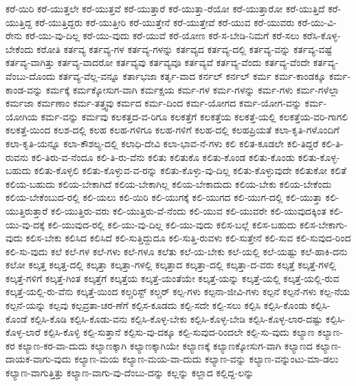 {ಕರೆ-ಯಿರಿ
ಕರೆ-ಯುತ್ತಲೇ
ಕರೆ-ಯುತ್ತವೆ
ಕರೆ-ಯುತ್ತಾರೆ
ಕರೆ-ಯುತ್ತಾ-ರೆಯೋ
ಕರೆ-ಯುತ್ತಾರೋ
ಕರೆ-ಯುತ್ತಿದೆ
ಕರೆ-ಯುತ್ತಿದ್ದ
ಕರೆ-ಯುತ್ತಿದ್ದರು
ಕರೆ-ಯುತ್ತೀರಿ
ಕರೆ-ಯುತ್ತೇನೆ
ಕರೆ-ಯುತ್ತೇವೆ
ಕರೆ-ಯುವ
ಕರೆ-ಯುವರು
ಕರೆ-ಯು-ವಿ-ರೇನು
ಕರೆ-ಯು-ವು-ದಿಲ್ಲ
ಕರೆ-ಯು-ವುದು
ಕರೆ-ಯುವೆ
ಕರೆ-ಯೋಣ
ಕರೆ-ಸ-ಬೇಡಿ-ನಿಮಗೆ
ಕರೆ-ಸಲು
ಕರೆಸಿ-ಕೊಳ್ಳ-ಬೇಕೆಂದು
ಕರೋತಿ
ಕರ್ತವ್ಯ
ಕರ್ತವ್ಯ-ಗಳ
ಕರ್ತವ್ಯ-ಗಳನ್ನು
ಕರ್ತವ್ಯದ
ಕರ್ತವ್ಯ-ದಲ್ಲಿ
ಕರ್ತವ್ಯ-ವನ್ನು
ಕರ್ತವ್ಯ-ವಷ್ಟೆ
ಕರ್ತವ್ಯ-ವಾಗಿತ್ತು
ಕರ್ತವ್ಯ-ವಾದರೋ
ಕರ್ತವ್ಯವು
ಕರ್ತವ್ಯವೂ
ಕರ್ತವ್ಯವೆ
ಕರ್ತವ್ಯ-ವೆಂದು
ಕರ್ತವ್ಯ-ವೆಂದೇ
ಕರ್ತವ್ಯ-ವೆಂಬು-ದೊಂದು
ಕರ್ತವ್ಯ-ವೆಲ್ಲ-ವನ್ನೂ
ಕರ್ತಾಭಜಾ
ಕರ್ತೃ-ವಾದ
ಕರ್ನಲ್
ಕರ್ನಲ್
ಕರ್ಮ
ಕರ್ಮ-ಕಾಂಡಕ್ಕೂ
ಕರ್ಮ-ಕಾಂಡ-ವನ್ನು
ಕರ್ಮಕ್ಕೆ
ಕರ್ಮಕ್ಕೋಸುಗ-ವಾಗಿ
ಕರ್ಮಕ್ಷಯ
ಕರ್ಮ-ಗಳ
ಕರ್ಮ-ಗಳನ್ನು
ಕರ್ಮ-ಗಳು
ಕರ್ಮ-ಗಳೆಲ್ಲಾ
ಕರ್ಮಜಾ
ಕರ್ಮಣಾಂ
ಕರ್ಮ-ತತ್ತ್ವವು
ಕರ್ಮದ
ಕರ್ಮ-ದಿಂದ
ಕರ್ಮ-ಯೋಗದ
ಕರ್ಮ-ಯೋಗ-ವನ್ನು
ಕರ್ಮ-ಯೋಗಿಯ
ಕರ್ಮ-ವನ್ನು
ಕರ್ಮವು
ಕಲಕತ್ತದ-ವ-ರಿಗೂ
ಕಲಕತ್ತೆಗೆ
ಕಲಕತ್ತೆಯ
ಕಲಕತ್ತೆ-ಯಲ್ಲಿ
ಕಲಕತ್ತೆಯ-ವರಿ-ಗಾಗಲಿ
ಕಲಕತ್ತೆ-ಯಿಂದ
ಕಲಶ-ದಲ್ಲಿ
ಕಲಹ
ಕಲಹ-ಗಳಿಗೂ
ಕಲಹ-ಗಳಿಗೆ
ಕಲಹ-ದಲ್ಲಿ
ಕಲಹಪ್ರಿಯತೆ
ಕಲಾ-ಕೃತಿ-ಗಳೊಂದಿಗೆ
ಕಲಾ-ಕೃತಿ-ಯನ್ನೂ
ಕಲಾ-ಕೌಶಲ್ಯ-ದಲ್ಲಿ
ಕಲಾಧಿ-ದೇವಿ
ಕಲಾ-ಭಾವ-ನೆ-ಗಳು
ಕಲಿ
ಕಲಿತ-ಕೂಡಲೇ
ಕಲಿ-ತಿದ್ದರೆ
ಕಲಿ-ತಿ-ರುವನು
ಕಲಿ-ತಿರು-ವ-ನೆಂದೂ
ಕಲಿ-ತಿ-ರು-ವೆನು
ಕಲಿತು
ಕಲಿತುಕೊ
ಕಲಿತು-ಕೊಂಡ
ಕಲಿತು-ಕೊಂಡು
ಕಲಿತು-ಕೊಳ್ಳ-ಬಹುದು
ಕಲಿತು-ಕೊಳ್ಳಲಿ
ಕಲಿತು-ಕೊಳ್ಳುವ-ವ-ರನ್ನು
ಕಲಿತು-ಕೊಳ್ಳು-ವು-ದಿಲ್ಲ
ಕಲಿತು-ಕೊಳ್ಳುವುದೇ
ಕಲಿತುಕೋ
ಕಲಿತೆ
ಕಲಿಯ-ಬಹುದು
ಕಲಿಯ-ಬೇಕಾಗಿದೆ
ಕಲಿಯ-ಬೇಕಾಗಿಲ್ಲ
ಕಲಿಯ-ಬೇಕಾದುದು
ಕಲಿಯ-ಬೇಕು
ಕಲಿಯ-ಬೇಕೆಂದು
ಕಲಿಯ-ಬೇಕೆಂಬುದ-ರಲ್ಲಿ
ಕಲಿ-ಯಲು
ಕಲಿ-ಯಿರಿ
ಕಲಿ-ಯುಗಕ್ಕೆ
ಕಲಿ-ಯುಗದ
ಕಲಿ-ಯುಗ-ದಲ್ಲಿ
ಕಲಿ-ಯುತ್ತಾ
ಕಲಿ-ಯುತ್ತಿರುತ್ತಾರೆ
ಕಲಿ-ಯುತ್ತಿರು-ವರು
ಕಲಿ-ಯುತ್ತಿರು-ವೆ-ನೆಂದು
ಕಲಿ-ಯುವ
ಕಲಿ-ಯುವರೇ
ಕಲಿ-ಯುವುದಕ್ಕಿಂತ
ಕಲಿ-ಯು-ವು-ದಕ್ಕೆ
ಕಲಿ-ಯುವುದ-ರಲ್ಲಿ
ಕಲಿ-ಯು-ವು-ದಿಲ್ಲ
ಕಲಿ-ಯು-ವುದು
ಕಲಿಸ-ಬಲ್ಲೆ
ಕಲಿಸ-ಬಹುದು
ಕಲಿಸ-ಬೇಕಾಗು-ವುದು
ಕಲಿಸ-ಬೇಕು
ಕಲಿಸಿದ
ಕಲಿಸಿದೆ
ಕಲಿ-ಸುತ್ತಿದ್ದುದೂ
ಕಲಿ-ಸುತ್ತಿ-ರುವಳು
ಕಲಿ-ಸುತ್ತೇನೆ
ಕಲಿ-ಸುವ
ಕಲಿ-ಸುವುದ-ರಿಂದ
ಕಲಿ-ಸು-ವುದು
ಕಲೆ
ಕಲೆ-ಗಳ
ಕಲೆ-ಗಳು
ಕಲೆ-ಗಳೂ
ಕಲೆತು
ಕಲೆ-ಯ-ಬೇಕು
ಕಲೆ-ಯಲ್ಲಿ
ಕಲೆ-ಯಷ್ಟು
ಕಲೆ-ಹಾಕಿ-ದನು
ಕಲೋ
ಕಲ್ಕತ್ತ
ಕಲ್ಕತ್ತ-ದಲ್ಲಿ
ಕಲ್ಕತ್ತಾ
ಕಲ್ಕತ್ತಾ-ಗಳಲ್ಲಿ
ಕಲ್ಕತ್ತಾದ
ಕಲ್ಕತ್ತಾ-ದಲ್ಲಿ
ಕಲ್ಕತ್ತಾ-ದ-ವರು
ಕಲ್ಕತ್ತೆ
ಕಲ್ಕತ್ತೆ-ಗಳಲ್ಲಿ
ಕಲ್ಕತ್ತೆ-ಗಳಿಗೆ
ಕಲ್ಕತ್ತೆ-ಗಿಂತ
ಕಲ್ಕತ್ತೆಗೆ
ಕಲ್ಕತ್ತೆಯ
ಕಲ್ಕತ್ತೆ-ಯಂತೆಯೇ
ಕಲ್ಕತ್ತೆ-ಯನ್ನು
ಕಲ್ಕತ್ತೆ-ಯಲ್ಲಿ
ಕಲ್ಕತ್ತೆ-ಯಲ್ಲಿ-ರುವ
ಕಲ್ಕತ್ತೆ-ಯಲ್ಲಿ-ರು-ವೆನು
ಕಲ್ಕತ್ತೆ-ಯಿಂದ
ಕಲ್ಚರಿಸ್ಟ್
ಕಲ್ಚರ್
ಕಲ್ಪ-ಗಳು
ಕಲ್ಪನಾ-ಜೀವಿ-ಗಳು
ಕಲ್ಪನೆ
ಕಲ್ಪನೆ-ಗಳು
ಕಲ್ಪ-ನೆಯ
ಕಲ್ಪನೆ-ಯನ್ನು
ಕಲ್ಪವು
ಕಲ್ಪವ್ರತಾ-ಚರ-ಣೆಗೆ
ಕಲ್ಪಿಸ-ಕೂಡದು
ಕಲ್ಪಿ-ಸದೇ
ಕಲ್ಪಿ-ಸಲು
ಕಲ್ಪಿಸಿ
ಕಲ್ಪಿಸಿ-ಕೊಂಡು
ಕಲ್ಪಿಸಿ-ಕೊಂಡೆ
ಕಲ್ಪಿಸಿ-ಕೊಡಿ
ಕಲ್ಪಿಸಿ-ಕೊಡು-ವನು
ಕಲ್ಪಿಸಿ-ಕೊಳ್ಳ-ಬೇಕು
ಕಲ್ಪಿಸಿ-ಕೊಳ್ಳ-ಬೇಡಿ
ಕಲ್ಪಿಸಿ-ಕೊಳ್ಳ-ಲಾರ-ದಷ್ಟು
ಕಲ್ಪಿಸಿ-ಕೊಳ್ಳ-ಲಾರೆ
ಕಲ್ಪಿಸಿ-ಕೊಳ್ಳಿ
ಕಲ್ಪಿ-ಸುತ್ತಾನೆ
ಕಲ್ಪಿಸು-ವು-ದಕ್ಕೂ
ಕಲ್ಪಿ-ಸುವುದ-ರಿಂದಲೇ
ಕಲ್ಪಿ-ಸು-ವುದು
ಕಲ್ಯಾಣ
ಕಲ್ಯಾಣ-ಕರ
ಕಲ್ಯಾಣ-ಕರ-ವಾ-ದುದು
ಕಲ್ಯಾಣಕ್ಕಾಗಿ
ಕಲ್ಯಾಣಕ್ಕಾಗಿಯೇ
ಕಲ್ಯಾಣಕ್ಕೆ
ಕಲ್ಯಾಣಕ್ಕೋಸುಗ-ವಾಗಿ
ಕಲ್ಯಾಣದ
ಕಲ್ಯಾಣ-ದಾಯಕ-ವಾಗು-ವುದು
ಕಲ್ಯಾಣ-ಮಯ
ಕಲ್ಯಾಣ-ಮಯ-ವಾ-ದುದು
ಕಲ್ಯಾಣ-ವನ್ನು
ಕಲ್ಯಾಣ-ವನ್ನುಂಟು-ಮಾ-ಡಲು
ಕಲ್ಯಾಣ-ವಾಗುತ್ತಿತ್ತು
ಕಲ್ಯಾಣ-ವಾಗು-ವು-ದೆಂಬು-ದನ್ನು
ಕಲ್ಲನ್ನು
ಕಲ್ಲಾದ
ಕಲ್ಲಿದ್ದ-ಲನ್ನು
}
